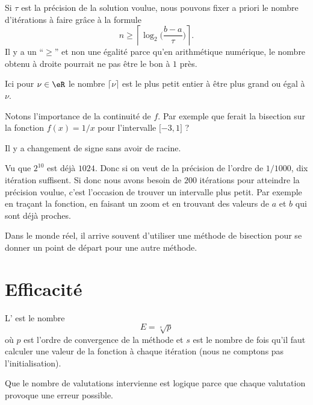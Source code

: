 Si \( \tau\) est la précision de la solution voulue, nous pouvons fixer a priori le nombre d'itérations à faire grâce à la formule
\begin{equation}
    n\geq\left\lceil  \log_2\big( \frac{ b-a }{ \tau } \big)  \right\rceil.
\end{equation}
Il y a un ``\( \geq\)'' et non une égalité parce qu'en arithmétique numérique, le nombre obtenu à droite pourrait ne pas être le bon à \( 1\) près.

Ici pour \( \nu\in \eR\) le nombre \( \lceil\nu\rceil\) est le plus petit entier à être plus grand ou égal à \( \nu\).

\begin{normaltext}
    Notons l'importance de la continuité de \( f\). Par exemple que ferait la bisection sur la fonction \( f(x)=1/x\) pour l'intervalle $\mathopen[ -3 , 1 \mathclose]$ ? 

    Il y a changement de signe sans avoir de racine.
\end{normaltext} 

Vu que \( 2^{10}\) est déjà \( 1024\). Donc si on veut de la précision de l'ordre de \( 1/1000\), dix itération suffisent. Si donc nous avons besoin de \( 200\) itérations pour atteindre la précision voulue, c'est l'occasion de trouver un intervalle plus petit. Par exemple en traçant la fonction, en faisant un zoom et en trouvant des valeurs de \( a\) et \( b\) qui sont déjà proches.


\begin{normaltext}
    Dans le monde réel, il arrive souvent d'utiliser une méthode de bisection pour se donner un point de départ pour une autre méthode.
\end{normaltext}

\section{Efficacité}

\begin{definition}
    L' est le nombre
    \begin{equation}
        E=\sqrt[s]{ p }
    \end{equation}
    où \( p\) est l'ordre de convergence de la méthode et \( s\) est le nombre de fois qu'il faut calculer une valeur de la fonction à chaque itération (nous ne comptons pas l'initialisation).
\end{definition}
Que le nombre de valutations intervienne est logique parce que chaque valutation provoque une erreur possible.

